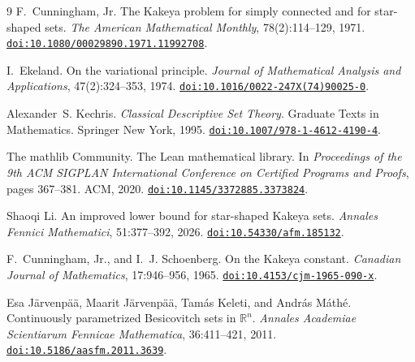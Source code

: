\begin{thebibliography}{9}
F.~Cunningham, Jr.
\newblock The Kakeya problem for simply connected and for star-shaped sets.
\newblock \emph{The American Mathematical Monthly}, 78(2):114--129, 1971.
\newblock \href{https://doi.org/10.1080/00029890.1971.11992708}{\nolinkurl{doi:10.1080/00029890.1971.11992708}}.

I.~Ekeland.
\newblock On the variational principle.
\newblock \emph{Journal of Mathematical Analysis and Applications}, 47(2):324--353, 1974.
\newblock \href{https://doi.org/10.1016/0022-247X(74)90025-0}{\nolinkurl{doi:10.1016/0022-247X(74)90025-0}}.

Alexander~S. Kechris.
\newblock \emph{Classical Descriptive Set Theory}.
\newblock Graduate Texts in Mathematics. Springer New York, 1995.
\newblock \href{https://doi.org/10.1007/978-1-4612-4190-4}{\nolinkurl{doi:10.1007/978-1-4612-4190-4}}.

The mathlib Community.
\newblock The Lean mathematical library.
\newblock In \emph{Proceedings of the 9th ACM SIGPLAN International Conference on Certified Programs and Proofs}, pages 367--381. ACM, 2020.
\newblock \href{https://doi.org/10.1145/3372885.3373824}{\nolinkurl{doi:10.1145/3372885.3373824}}.

Shaoqi Li.
\newblock An improved lower bound for star-shaped Kakeya sets.
\newblock \emph{Annales Fennici Mathematici}, 51:377--392, 2026.
\newblock \href{https://doi.org/10.54330/afm.185132}{\nolinkurl{doi:10.54330/afm.185132}}.

F.~Cunningham, Jr., and I.~J. Schoenberg.
\newblock On the Kakeya constant.
\newblock \emph{Canadian Journal of Mathematics}, 17:946--956, 1965.
\newblock \href{https://doi.org/10.4153/cjm-1965-090-x}{\nolinkurl{doi:10.4153/cjm-1965-090-x}}.

Esa J{\"a}rvenp{\"a}{\"a}, Maarit J{\"a}rvenp{\"a}{\"a}, Tam{\'a}s Keleti, and Andr{\'a}s M{\'a}th{\'e}.
\newblock Continuously parametrized Besicovitch sets in $\mathbb R^n$.
\newblock \emph{Annales Academiae Scientiarum Fennicae Mathematica}, 36:411--421, 2011.
\newblock \href{https://doi.org/10.5186/aasfm.2011.3639}{\nolinkurl{doi:10.5186/aasfm.2011.3639}}.
\end{thebibliography}
